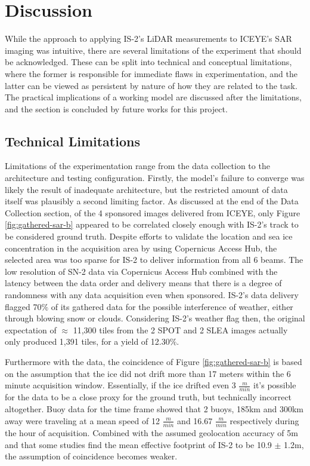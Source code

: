 \chapter{Discussion}
\label{sec:Discussion}
While the approach to applying IS-2's LiDAR measurements to ICEYE's SAR imaging was intuitive, there are several limitations of the experiment that should be acknowledged. These can be split into technical and conceptual limitations, where the former is responsible for immediate flaws in experimentation, and the latter can be viewed as persistent by nature of how they are related to the task. The practical implications of a working model are discussed after the limitations, and the section is concluded by future works for this project.

\section{Technical Limitations}
Limitations of the experimentation range from the data collection to the architecture and testing configuration. Firstly, the model's failure to converge was likely the result of inadequate architecture, but the restricted amount of data itself was plausibly a second limiting factor. As discussed at the end of the Data Collection section, of the 4 sponsored images delivered from ICEYE, only Figure \ref{fig:gathered-sar-b} appeared to be correlated closely enough with IS-2's track to be considered ground truth. Despite efforts to validate the location and sea ice concentration in the acquisition area by using Copernicus Access Hub, the selected area was too sparse for IS-2 to deliver information from all 6 beams. The low resolution of SN-2 data via Copernicus Access Hub combined with the latency between the data order and delivery means that there is a degree of randomness with any data acquisition even when sponsored. IS-2's data delivery flagged 70$\%$ of its gathered data for the possible interference of weather, either through blowing snow or clouds. Considering IS-2's weather flag then, the original expectation of $\approx$ 11,300 tiles from the 2 SPOT and 2 SLEA images actually only produced 1,391 tiles, for a yield of 12.30$\%$.

Furthermore with the data, the coincidence of Figure \ref{fig:gathered-sar-b} is based on the assumption that the ice did not drift more than 17 meters within the 6 minute acquisition window. Essentially, if the ice drifted even 3 $\frac{m}{min}$ it's possible for the data to be a close proxy for the ground truth, but technically incorrect altogether. Buoy data for the time frame showed that 2 buoys, 185km and 300km away were traveling at a mean speed of 12 $\frac{m}{min}$ and 16.67 $\frac{m}{min}$ respectively during the hour of acquisition. Combined with the assumed geolocation accuracy of 5m \cite{ICESat-2-Horizontal-Accuracy} and that some studies find the mean effective footprint of IS-2 to be 10.9 $\pm$ 1.2m\cite{icesatfootprintdiameter}, the assumption of coincidence becomes weaker.

